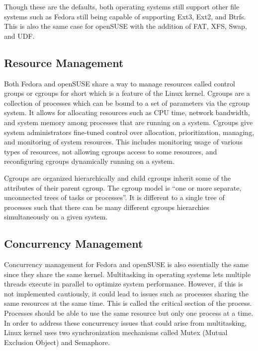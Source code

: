 \documentclass{article}
\begin{document}
Though these are the defaults, both operating systems still support other file
systems such as Fedora still being capable of supporting Ext3, Ext2, and Btrfs.
This is also the same case for openSUSE with the addition of FAT, XFS, Swap, and
UDF. \parencite{fedora_file_system, suse_documentation,
  expert_partitioner}

\subsection{Resource Management}
Both Fedora and openSUSE share a way to manage resources called control groups
or cgroups for short which is a feature of the Linux kernel. Cgroups are a
collection of processes which can be bound to a set of parameters via the cgroup
system. It allows for allocating resources such as CPU time, network bandwidth,
and system memory among processes that are running on a system. Cgroups give
system administrators fine-tuned control over allocation, prioritization,
managing, and monitoring of system resources. This includes monitoring usage of
various types of resources, not allowing cgroups access to some resources, and
reconfiguring cgroups dynamically running on a system. \parencite{cgroups,
  cgroups_linux_manual_page}

Cgroups are organized hierarchically and child cgroups inherit some of the
attributes of their parent cgroup. The cgroup model is “one or more separate,
unconnected trees of tasks or processes”. It is different to a single tree of
processes such that there can be many different cgroups hierarchies
simultaneously on a given system.\parencite{cgroups}

\subsection{Concurrency Management}
Concurrency management for Fedora and openSUSE is also essentially the same
since they share the same kernel. Multitasking in operating systems lets
multiple threads execute in parallel to optimize system performance. However, if
this is not implemented cautiously, it could lead to issues such as processes
sharing the same resources at the same time. This is called the critical section
of the process. Processes should be able to use the same resource but only one
process at a time. In order to address these concurrency issues that could arise
from multitasking, Linux kernel uses two synchronization mechanisms called Mutex
(Mutual Exclusion Object) and Semaphore. \parencite{concurrency,
  concurrency_linux}
\end{document}
